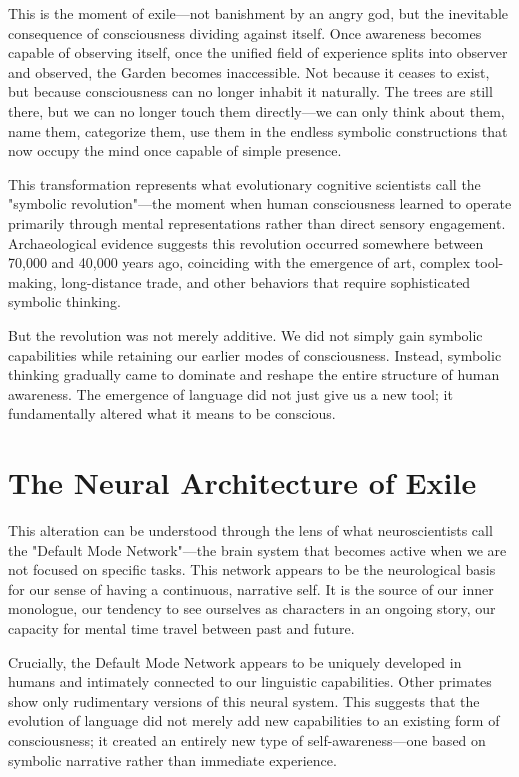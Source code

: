 This is the moment of exile—not banishment by an angry god, but the inevitable consequence of consciousness dividing against itself. Once awareness becomes capable of observing itself, once the unified field of experience splits into observer and observed, the Garden becomes inaccessible. Not because it ceases to exist, but because consciousness can no longer inhabit it naturally. The trees are still there, but we can no longer touch them directly—we can only think about them, name them, categorize them, use them in the endless symbolic constructions that now occupy the mind once capable of simple presence.

This transformation represents what evolutionary cognitive scientists call the "symbolic revolution"—the moment when human consciousness learned to operate primarily through mental representations rather than direct sensory engagement. Archaeological evidence suggests this revolution occurred somewhere between 70,000 and 40,000 years ago, coinciding with the emergence of art, complex tool-making, long-distance trade, and other behaviors that require sophisticated symbolic thinking.

But the revolution was not merely additive. We did not simply gain symbolic capabilities while retaining our earlier modes of consciousness. Instead, symbolic thinking gradually came to dominate and reshape the entire structure of human awareness. The emergence of language did not just give us a new tool; it fundamentally altered what it means to be conscious.

\section{The Neural Architecture of Exile}

This alteration can be understood through the lens of what neuroscientists call the "Default Mode Network"—the brain system that becomes active when we are not focused on specific tasks. This network appears to be the neurological basis for our sense of having a continuous, narrative self. It is the source of our inner monologue, our tendency to see ourselves as characters in an ongoing story, our capacity for mental time travel between past and future.

Crucially, the Default Mode Network appears to be uniquely developed in humans and intimately connected to our linguistic capabilities. Other primates show only rudimentary versions of this neural system. This suggests that the evolution of language did not merely add new capabilities to an existing form of consciousness; it created an entirely new type of self-awareness—one based on symbolic narrative rather than immediate experience.

